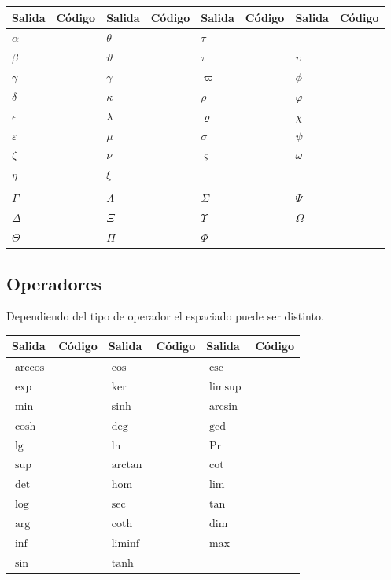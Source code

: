 \documentclass{article}
\numberwithin{equation}{section}
\theoremstyle{plain}
\theoremstyle{definition}
\theoremstyle{remark}
\def\X#1{$#1$ & \texttt{#1}} %
\begin{document}
\begin{table}[H]
\centering
\begin{tabular}{@{}*8l@{}}
\toprule
Salida & Código & Salida & Código & Salida & Código & Salida & Código \\
\midrule
\X\alpha        &\X\theta       & \X\tau      &         &        \\
\X\beta         &\X\vartheta    &\X\pi          &\X\upsilon     \\
\X\gamma        &\X\gamma       &\X\varpi       &\X\phi         \\
\X\delta        &\X\kappa       &\X\rho         &\X\varphi      \\
\X\epsilon      &\X\lambda      &\X\varrho      &\X\chi         \\
\X\varepsilon   &\X\mu          &\X\sigma       &\X\psi         \\
\X\zeta         &\X\nu          &\X\varsigma    &\X\omega       \\
\X\eta          &\X\xi                                          \\
                                                                \\
\X\Gamma        &\X\Lambda      &\X\Sigma       &\X\Psi         \\
\X\Delta        &\X\Xi          &\X\Upsilon     &\X\Omega       \\
\X\Theta        &\X\Pi          &\X\Phi\\
\bottomrule
\end{tabular}
\end{table}

    
\subsection*{Operadores}

 Dependiendo del tipo de operador el espaciado puede ser distinto.



\begin{table}[h]
\centering
\begin{tabular}{@{}*6l@{}}
\toprule
Salida & Código & Salida & Código & Salida & Código \\
\midrule
\X\arccos & \X\cos & \X\csc \\
\X\exp &  \X\ker & \X\limsup \\
\X\min & \X\sinh & \X\arcsin \\
\X\cosh & \X\deg &  \X\gcd \\ 
\X\lg & \X\ln & \X\Pr \\ 
\X\sup & \X\arctan &  \X\cot \\
\X\det & \X\hom & \X\lim \\ 
\X\log & \X\sec &  \X\tan \\
\X\arg & \X\coth & \X\dim  \\
\X\inf & \X\liminf & \X\max \\
\X\sin & \X\tanh & \\
\bottomrule
\end{tabular}
\end{table}
\end{document}

